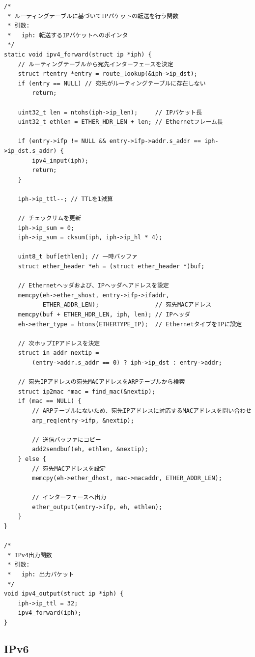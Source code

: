 \begin{lstlisting}[caption=ipv4\_forward関数,label=src:ipv4_forward]
/*
 * ルーティングテーブルに基づいてIPパケットの転送を行う関数
 * 引数:
 *   iph: 転送するIPパケットへのポインタ
 */
static void ipv4_forward(struct ip *iph) {
    // ルーティングテーブルから宛先インターフェースを決定
    struct rtentry *entry = route_lookup(&iph->ip_dst);
    if (entry == NULL) // 宛先がルーティングテーブルに存在しない
        return;

    uint32_t len = ntohs(iph->ip_len);     // IPパケット長
    uint32_t ethlen = ETHER_HDR_LEN + len; // Ethernetフレーム長

    if (entry->ifp != NULL && entry->ifp->addr.s_addr == iph->ip_dst.s_addr) {
        ipv4_input(iph);
        return;
    }

    iph->ip_ttl--; // TTLを1減算

    // チェックサムを更新
    iph->ip_sum = 0;
    iph->ip_sum = cksum(iph, iph->ip_hl * 4);

    uint8_t buf[ethlen]; // 一時バッファ
    struct ether_header *eh = (struct ether_header *)buf;

    // Ethernetヘッダおよび、IPヘッダへアドレスを設定
    memcpy(eh->ether_shost, entry->ifp->ifaddr,
           ETHER_ADDR_LEN);                // 宛先MACアドレス
    memcpy(buf + ETHER_HDR_LEN, iph, len); // IPヘッダ
    eh->ether_type = htons(ETHERTYPE_IP);  // EthernetタイプをIPに設定

    // 次ホップIPアドレスを決定
    struct in_addr nextip =
        (entry->addr.s_addr == 0) ? iph->ip_dst : entry->addr;

    // 宛先IPアドレスの宛先MACアドレスをARPテーブルから検索
    struct ip2mac *mac = find_mac(&nextip);
    if (mac == NULL) {
        // ARPテーブルにないため、宛先IPアドレスに対応するMACアドレスを問い合わせ
        arp_req(entry->ifp, &nextip);

        // 送信バッファにコピー
        add2sendbuf(eh, ethlen, &nextip);
    } else {
        // 宛先MACアドレスを設定
        memcpy(eh->ether_dhost, mac->macaddr, ETHER_ADDR_LEN);

        // インターフェースへ出力
        ether_output(entry->ifp, eh, ethlen);
    }
}

/*
 * IPv4出力関数
 * 引数:
 *   iph: 出力パケット
 */
void ipv4_output(struct ip *iph) {
    iph->ip_ttl = 32;
    ipv4_forward(iph);
}
\end{lstlisting}

\subsection{IPv6} \label{sec:ipv6}

